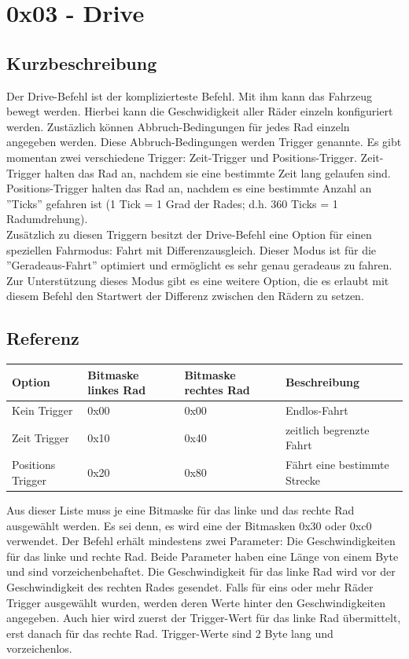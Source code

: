 \documentclass[a4paper]{article}
\begin{document}
	\section{0x03 - Drive}

	\subsection{Kurzbeschreibung}
	
	Der Drive-Befehl ist der komplizierteste Befehl. Mit ihm kann das
	Fahrzeug bewegt werden. Hierbei kann die Geschwidigkeit aller Räder
	einzeln konfiguriert werden. Zustäzlich können Abbruch-Bedingungen
	für jedes Rad einzeln angegeben werden. Diese Abbruch-Bedingungen
	werden Trigger genannte. Es gibt momentan zwei verschiedene Trigger:
	Zeit-Trigger und Positions-Trigger. Zeit-Trigger halten das Rad an,
	nachdem sie eine bestimmte Zeit lang gelaufen sind. Positions-Trigger
	halten das Rad an, nachdem es eine bestimmte Anzahl an ''Ticks''
	gefahren ist (1 Tick = 1 Grad der Rades; d.h. 360 Ticks = 1
	Radumdrehung).
	\\
	Zusätzlich zu diesen Triggern besitzt der Drive-Befehl eine Option
	für einen speziellen Fahrmodus: Fahrt mit Differenzausgleich. Dieser
	Modus ist für die ''Geradeaus-Fahrt'' optimiert und ermöglicht es
	sehr genau geradeaus zu fahren. Zur Unterstützung dieses Modus
	gibt es eine weitere Option, die es erlaubt mit diesem Befehl den
	Startwert der Differenz zwischen den Rädern zu setzen.

	\subsection{Referenz}

	\begin{tabularx}{\linewidth}{|l|l|l|X|}
		\hline
		\textbf{Option} & \textbf{Bitmaske linkes Rad} & \textbf{Bitmaske rechtes Rad} & \textbf{Beschreibung} \\
		\hline
		\hline
		Kein Trigger	& 0x00						   & 0x00						   & Endlos-Fahrt \\
		\hline
		Zeit Trigger	& 0x10						   & 0x40						   & zeitlich begrenzte Fahrt\\
		\hline
		Positions Trigger & 0x20					   & 0x80						   & Fährt eine bestimmte Strecke \\
		\hline
	\end{tabularx}

	Aus dieser Liste muss je eine Bitmaske für das linke und das rechte
	Rad ausgewählt werden. Es sei denn, es wird eine der Bitmasken 0x30
	oder 0xc0 verwendet. Der Befehl erhält mindestens zwei Parameter:
	Die Geschwindigkeiten für das linke und rechte Rad. Beide
	Parameter haben eine Länge von einem Byte und sind vorzeichenbehaftet.
	Die Geschwindigkeit für das linke Rad wird vor der Geschwindigkeit
	des rechten Rades gesendet. Falls für eins oder mehr Räder Trigger
	ausgewählt wurden, werden deren Werte hinter den Geschwindigkeiten
	angegeben. Auch hier wird zuerst der Trigger-Wert für das linke Rad
	übermittelt, erst danach für das rechte Rad. Trigger-Werte sind
	2 Byte lang und vorzeichenlos.
	
\end{document}
